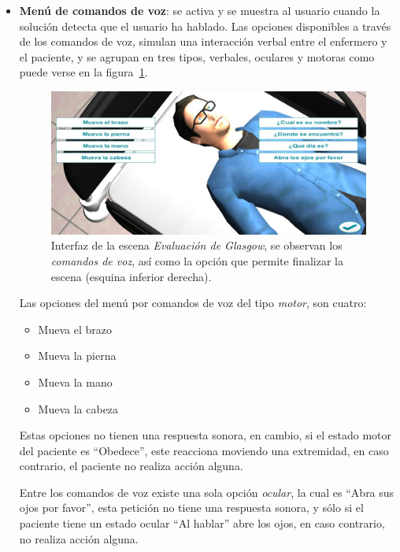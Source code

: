 \begin{itemize}
\item{\textbf{Menú de comandos de voz}:} se activa y se muestra al usuario
    cuando la solución detecta que el usuario ha hablado. Las opciones
    disponibles a través de los comandos de voz, simulan una interacción verbal
    entre el enfermero y el paciente, y se agrupan en tres tipos, verbales,
    oculares y motoras como puede verse en la figura~\ref{fig:glasgow_gui}. 

\begin{figure}[hbt]
\centering
\includegraphics[scale=0.5]{solucion/images/glasgow_comandos_voz.jpg}
\caption{Interfaz de la escena \emph{Evaluación de Glasgow}, se observan los
    \emph{comandos de voz}, así como la opción que permite finalizar la escena
    (esquina inferior derecha).}
\label{fig:glasgow_gui}
\end{figure}

Las opciones del menú por comandos de voz del tipo \emph{motor}, son cuatro: 

\begin{itemize}
    \item Mueva el brazo
    \item Mueva la pierna
    \item Mueva la mano
    \item Mueva la cabeza
\end{itemize}

Estas opciones no tienen una respuesta sonora, en cambio, si el estado motor del paciente es
\enquote{Obedece}, este reacciona moviendo una extremidad, en caso
contrario, el paciente no realiza acción alguna.

Entre los comandos de voz existe una sola opción \emph{ocular}, la cual es 
\enquote{Abra sus ojos por
favor}, esta petición no tiene una respuesta sonora, y sólo si el paciente tiene un
estado ocular \enquote{Al hablar} abre los ojos, en caso contrario, no realiza
acción alguna.


\end{itemize}
